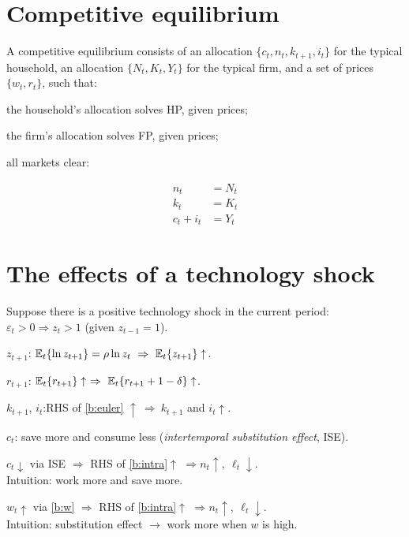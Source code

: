 \documentclass[11pt]{article}
\begin{document}
\section{Competitive equilibrium}

A competitive equilibrium consists of an allocation $\{c_t,n_t,k_{t+1},i_t\}$ for the
typical household, an allocation $\{N_t,K_t,Y_t\}$ for the typical firm, and a set of
prices $\{w_t,r_t\}$, such that:
\begin{flatlist}
  \item[(i)] the household's allocation solves HP, given prices;
  \item[(ii)] the firm's allocation solves FP, given prices;
  \item[(iii)] all markets clear:
\end{flatlist}
\begin{align}
  n_t &= N_t \tag{16}\label{b:mcn}\\
  k_t &= K_t \tag{17}\label{b:mck}\\
  c_t+i_t &= Y_t \tag{18}\label{b:mcy}
\end{align}


\section{The effects of a technology shock}

Suppose there is a positive technology shock in the current period:
$\varepsilon_t>0\Rightarrow z_t>1$ (given $z_{t-1}=1$).

 $z_{t+1}$:\quad
$\E_t\{\ln z_{t+1}\}=\rho\ln z_t\ \Rightarrow\ \E_t\{z_{t+1}\}\uparrow$.

 $r_{t+1}$:\quad
$\E_t\{r_{t+1}\}\uparrow\ \Rightarrow\ \E_t\{r_{t+1}+1-\delta\}\uparrow$.

 $k_{t+1}$, $i_t$:\quad RHS of \eqref{b:euler}
$\uparrow\ \Rightarrow\ k_{t+1}$ and $i_t\uparrow$.

$c_t$: save more and consume less (\emph{intertemporal substitution effect}, ISE).

\begin{flatlist}
  \item[(i)] $c_t\downarrow$ via ISE $\Rightarrow$ RHS of \eqref{b:intra}$\uparrow$
        $\Rightarrow n_t\uparrow,\ \ell_t\downarrow$.\\
        Intuition: work more and save more.
  \item[(ii)] $w_t\uparrow$ via \eqref{b:w} $\Rightarrow$ RHS of \eqref{b:intra}$\uparrow$
        $\Rightarrow n_t\uparrow,\ \ell_t\downarrow$.\\
        Intuition: substitution effect $\to$ work more when $w$ is high.
\end{flatlist}
\end{document}
